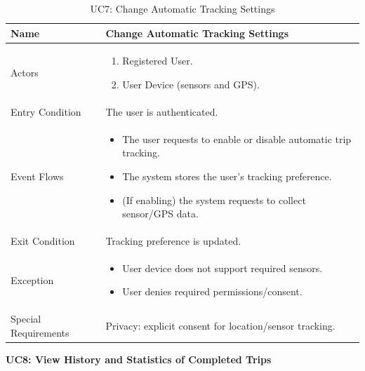 \begin{table}[H]
    \centering
    \renewcommand{\arraystretch}{1.3}
    \begin{tabular}{|p{}|p{}|}
        \hline
        Name & \textbf{Change Automatic Tracking Settings} \\
        \hline
        Actors & \begin{enumerate}[topsep=0pt, partopsep=0pt, leftmargin=*]
            \item Registered User.
            \item User Device (sensors and GPS).
        \end{enumerate} \\
        \hline
        Entry Condition & The user is authenticated. \\
        \hline
        Event Flows & \begin{itemize}[topsep=0pt, partopsep=0pt, leftmargin=*]
            \item The user requests to enable or disable automatic trip tracking.
            \item The system stores the user’s tracking preference.
            \item (If enabling) the system requests to collect sensor/GPS data.
        \end{itemize} \\
        \hline
        Exit Condition & Tracking preference is updated. \\
        \hline
        Exception & \begin{itemize}[topsep=0pt, partopsep=0pt, leftmargin=*]
            \item User device does not support required sensors.
            \item User denies required permissions/consent.
        \end{itemize} \\
        \hline
        Special Requirements & Privacy: explicit consent for location/sensor tracking. \\
        \hline
    \end{tabular}
    \caption{UC7: Change Automatic Tracking Settings}
    \label{uc7}
\end{table}

\newpage
\noindent
\textbf{UC8: View History and Statistics of Completed Trips}

